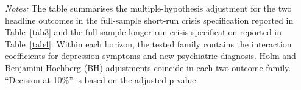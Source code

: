 \documentclass[arguments, manuscript, 11pt]{aastex631}
\begin{document}
\newpage
\begin{table}[h]
\centering
\caption{Multiple-hypothesis test summary for the headline crisis outcomes}
\label{tabB3}
\tiny{{\singlespacing \emph{Notes:} The table summarises the multiple-hypothesis adjustment for the two headline outcomes in the full-sample short-run crisis specification reported in Table~\ref{tab3} and the full-sample longer-run crisis specification reported in Table~\ref{tab4}. Within each horizon, the tested family contains the interaction coefficients for depression symptoms and new psychiatric diagnosis. Holm and Benjamini-Hochberg (BH) adjustments coincide in each two-outcome family. ``Decision at 10\%'' is based on the adjusted p-value.}}
\end{table}
\end{document}
